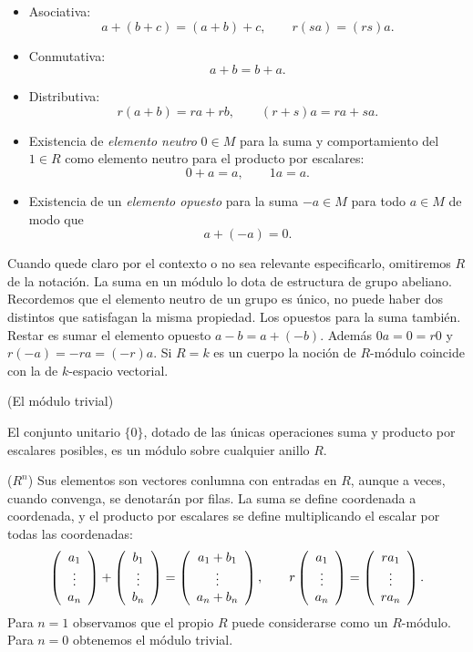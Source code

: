 \begin{itemize}
\item
  Asociativa: \[a+(b+c)=(a+b)+c,\qquad r(sa)=(rs)a.\]
\item
  Conmutativa: \[a+b=b+a.\]
\item
  Distributiva: \[r(a+b)=ra+rb,\qquad (r+s)a=ra+sa.\]
\item
  Existencia de \emph{elemento neutro} \(0\in M\) para la suma y
  comportamiento del \(1\in R\) como elemento neutro para el producto
  por escalares: \[0+a=a,\qquad 1a=a.\]
\item
  Existencia de un \emph{elemento opuesto} para la suma \(-a\in M\) para
  todo \(a\in M\) de modo que \[a+(-a)=0.\]
\end{itemize}



Cuando quede claro por el contexto o no sea relevante especificarlo,
omitiremos \(R\) de la notación. La suma en un módulo lo dota de
estructura de grupo abeliano. Recordemos que el elemento neutro de un
grupo es único, no puede haber dos distintos que satisfagan la misma
propiedad. Los opuestos para la suma también. Restar es sumar el
elemento opuesto \(a-b=a+(-b)\). Además \(0a=0=r0\) y
\(r(-a)=-ra=(-r)a\). Si \(R=k\) es un cuerpo la noción de \(R\)-módulo
coincide con la de \(k\)-espacio vectorial. 

\textrm{\normalfont (El módulo trivial)}

El conjunto unitario \(\{0\}\), dotado de las únicas operaciones suma
y producto por escalares posibles, es un módulo sobre cualquier anillo
\(R\).


\textrm{\normalfont ($R^n$)} Sus elementos son vectores
conlumna con entradas en \(R\), aunque a veces, cuando convenga, se
denotarán por filas. La suma se define coordenada a coordenada, y el
producto por escalares se define multiplicando el escalar por todas las
coordenadas:
\[\left(\begin{array}{c}a_1\cr\vdots\cr a_n\end{array}\right)+\left(\begin{array}{c}b_1\cr\vdots\cr b_n\end{array}\right)=\left(\begin{array}{c}a_1+b_1\cr\vdots\cr a_n+b_n\end{array}\right),\qquad r\left(\begin{array}{c}a_1\cr\vdots\cr a_n\end{array}\right)=\left(\begin{array}{c}ra_1\cr\vdots\cr ra_n\end{array}\right).\]
Para \(n=1\) observamos que el propio \(R\) puede considerarse como un
\(R\)-módulo. Para \(n=0\) obtenemos el módulo trivial. 

